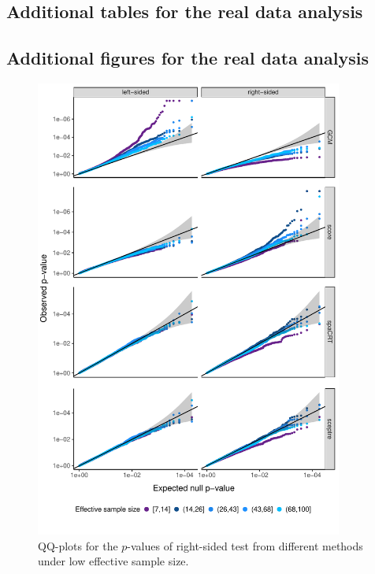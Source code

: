 \documentclass[12pt]{article}
\theoremstyle{definition}
\begin{document}
\subsection{Additional tables for the real data analysis}\label{sec:additional_table_realdata}




\subsection{Additional figures for the real data analysis}\label{sec:additional_figure_realdata}

\begin{figure}[!ht]
	\centering
	\includegraphics[width=0.9\textwidth]{figures-and-tables/facet_plot_different_withglmnb_100.pdf}
	\caption{QQ-plots for the $p$-values of right-sided test from different methods under low effective sample size.}
	\label{fig:qqplot_lowess}
\end{figure}
\end{document}
